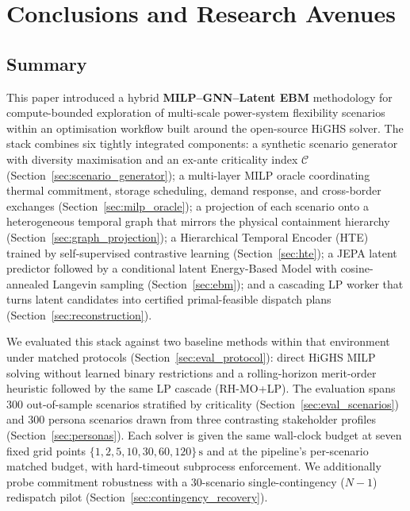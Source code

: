 \documentclass{article}
\begin{document}

\section{Conclusions and Research Avenues}
\label{sec:conclusion}

\subsection{Summary}
\label{sec:summary}

This paper introduced a hybrid \textbf{MILP--GNN--Latent EBM} methodology for compute-bounded exploration of multi-scale power-system flexibility scenarios within an optimisation workflow built around the open-source HiGHS solver. The stack combines six tightly integrated components: a synthetic scenario generator with diversity maximisation and an ex-ante criticality index $\mathcal{C}$ (Section~\ref{sec:scenario_generator}); a multi-layer MILP oracle coordinating thermal commitment, storage scheduling, demand response, and cross-border exchanges (Section~\ref{sec:milp_oracle}); a projection of each scenario onto a heterogeneous temporal graph that mirrors the physical containment hierarchy (Section~\ref{sec:graph_projection}); a Hierarchical Temporal Encoder (HTE) trained by self-supervised contrastive learning (Section~\ref{sec:hte}); a JEPA latent predictor followed by a conditional latent Energy-Based Model with cosine-annealed Langevin sampling (Section~\ref{sec:ebm}); and a cascading LP worker that turns latent candidates into certified primal-feasible dispatch plans (Section~\ref{sec:reconstruction}).

We evaluated this stack against two baseline methods within that environment under matched protocols (Section~\ref{sec:eval_protocol}): direct HiGHS MILP solving without learned binary restrictions and a rolling-horizon merit-order heuristic followed by the same LP cascade (RH-MO+LP). The evaluation spans $300$ out-of-sample scenarios stratified by criticality (Section~\ref{sec:eval_scenarios}) and $300$ persona scenarios drawn from three contrasting stakeholder profiles (Section~\ref{sec:personas}). Each solver is given the same wall-clock budget at seven fixed grid points $\{1, 2, 5, 10, 30, 60, 120\}\,\mathrm{s}$ and at the pipeline's per-scenario matched budget, with hard-timeout subprocess enforcement. We additionally probe commitment robustness with a $30$-scenario single-contingency ($N{-}1$) redispatch pilot (Section~\ref{sec:contingency_recovery}).
\end{document}
